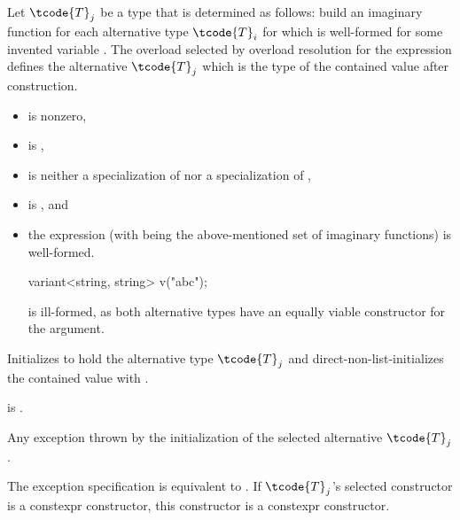 \begin{itemdescr}
\pnum
Let $\tcode{T}_j$ be a type that is determined as follows:
build an imaginary function 
for each alternative type $\tcode{T}_i$
for which  
is well-formed for some invented variable .
The overload  selected by overload
resolution for the expression  defines
the alternative $\tcode{T}_j$ which is the type of the contained value after
construction.

\pnum
\constraints
\begin{itemize}
\item
{} is nonzero,

\item
{} is ,

\item
{} is neither
a specialization of  nor
a specialization of ,

\item
{} is , and

\item
the expression \brk{}
(with  being the above-mentioned set of
imaginary functions) is well-formed.
\begin{note}
\begin{codeblock}
variant<string, string> v("abc");
\end{codeblock}
is ill-formed, as both alternative types have an equally viable constructor
for the argument.
\end{note}
\end{itemize}

\pnum
\effects
Initializes  to hold the alternative type $\tcode{T}_j$ and
direct-non-list-initializes the contained value with .

\pnum
\ensures
{} is .

\pnum
\throws
Any exception thrown by the initialization of the selected alternative $\tcode{T}_j$.

\pnum
\remarks
The exception specification is equivalent to
.
If $\tcode{T}_j$'s selected constructor is a constexpr constructor,
this constructor is a constexpr constructor.
\end{itemdescr}


